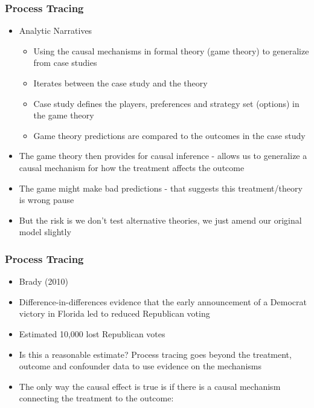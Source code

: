 \documentclass[xcolor=x11names,compress]{beamer}\usepackage[]{graphicx}\usepackage[]{color}
\renewcommand{\(}{\begin{columns}}
\renewcommand{\)}{\end{columns}}
\newcommand{\<}[1]{\begin{column}{#1}}
\renewcommand{\>}{\end{column}}
\begin{document}
\begin{frame}
\frametitle{Process Tracing}
\begin{itemize}
\item Analytic Narratives
\pause
\begin{itemize}
\item Using the causal mechanisms in formal theory (game theory) to generalize from case studies
\pause
\item Iterates between the case study and the theory
\pause
\item Case study defines the players, preferences and strategy set (options) in the game theory
\pause
\item Game theory predictions are compared to the outcomes in the case study
\pause
\end{itemize}
\item The game theory then provides for causal inference - allows us to generalize a causal mechanism for how the treatment affects the outcome
\pause
\item The game might make bad predictions - that suggests this treatment/theory is wrong
pause
\item But the risk is we don't test alternative theories, we just amend our original model slightly
\end{itemize}
\end{frame}


\begin{frame}
\frametitle{Process Tracing}
\begin{itemize}
\item Brady (2010)
\pause
\item Difference-in-differences evidence that the early announcement of a Democrat victory in Florida led to reduced Republican voting
\pause
\item Estimated 10,000 lost Republican votes
\pause
\item Is this a reasonable estimate? Process tracing goes beyond the treatment, outcome and confounder data to use evidence on the mechanisms
\pause
\item The only way the causal effect is true is if there is a causal mechanism connecting the treatment to the outcome:
\end{itemize}
\end{frame}
\end{document}
